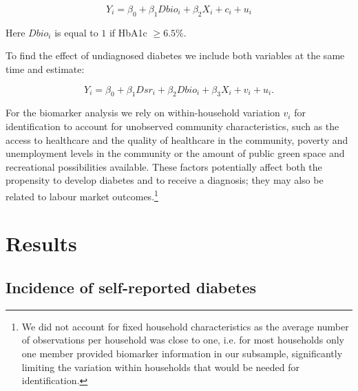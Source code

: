 \begin{equation}
Y_{i}=\beta_{0}+\beta_{1}Dbio_{i}+\beta_{2}X_{i}+c_{i}+u_{i}\label{eq:diab}
\end{equation}

Here $Dbio_{i}$ is equal to $1$ if \ac{HbA1c} $\geq6.5\%$. 

To find the effect of undiagnosed diabetes we include both variables at the same time and estimate:

\begin{equation}
Y_{i}=\beta_{0}+\beta_{1}Dsr_{i}+\beta_{2}Dbio_{i}+\beta_{3}X_{i}+v_{i}+u_{i}.\label{eq:diab_ud}
\end{equation}

For the biomarker analysis we rely on within-household variation $v_{i}$ for identification to account for unobserved community characteristics, such as the access to healthcare and the quality of healthcare in the community, poverty and unemployment levels in the community or the amount of public green space and recreational possibilities available. These factors potentially affect both the propensity to develop diabetes and to receive a diagnosis; they may also be related to labour market outcomes.\footnote{We did not account for fixed household characteristics as the average number of observations per household was close to one, i.e. for most households only one member provided biomarker information in our subsample, significantly limiting the variation within households that would be needed for identification.}

\section{\label{sec:RESULTS} Results}


\subsection{Incidence of self-reported diabetes}

